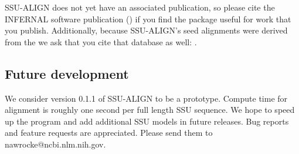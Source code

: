 SSU-ALIGN does not yet have an associated publication,
so please cite the INFERNAL software publication
(\cite{Nawrocki09}) if you find the package useful for work that
you publish. Additionally, because SSU-ALIGN's seed alignments were
derived from the  we ask that you cite
that database as well: \cite{CannoneGutell02}. 

\subsection{Future development}

We consider version 0.1.1 of SSU-ALIGN to be a prototype. 
Compute time for alignment is roughly one second per full length SSU
sequence. We hope to speed up the program and add additional SSU
models in future releases. Bug reports and feature requests are
appreciated. Please send them to nawrocke@ncbi.nlm.nih.gov.


